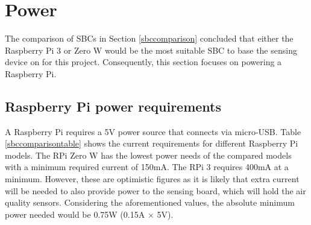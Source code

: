 \documentclass[11pt]{report}
\begin{document}


\section{Power} \label{power}

The comparison of SBCs in Section \ref{sbccomparison} concluded that either the Raspberry Pi 3 or Zero W would be the most suitable SBC to base the sensing device on for this project. Consequently, this section focuses on powering a Raspberry Pi.

\subsection{Raspberry Pi power requirements}


A Raspberry Pi requires a 5V power source that connects via micro-USB. Table \ref{sbccomparisontable} shows the current requirements for different Raspberry Pi models. The RPi Zero W has the lowest power needs of the compared models with a minimum required current of 150mA. The RPi 3 requires 400mA at a minimum. However, these are optimistic figures as it is likely that extra current will be needed to also provide power to the sensing board, which will hold the air quality sensors. Considering the aforementioned values, the absolute minimum power needed would be 0.75W (0.15A $\times$ 5V).


\end{document}
